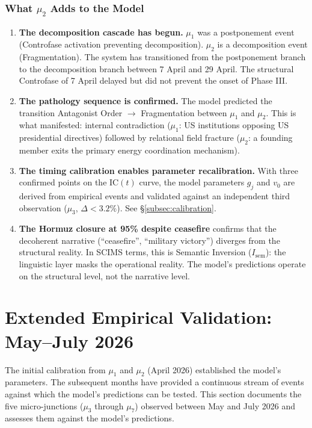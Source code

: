 \documentclass[12pt,a4paper]{article}
\newcommand{\gj}{g_j}
\newcommand{\IC}{\mathrm{IC}}
\begin{document}
\subsubsection{What $\mu_2$ Adds to the Model}

\begin{enumerate}[leftmargin=2em]
    \item \textbf{The decomposition cascade has begun.} $\mu_1$ was a postponement event (Controfase activation preventing decomposition). $\mu_2$ is a decomposition event (Fragmentation). The system has transitioned from the postponement branch to the decomposition branch between 7 April and 29 April. The structural Controfase of 7 April delayed but did not prevent the onset of Phase III.
    \item \textbf{The pathology sequence is confirmed.} The model predicted the transition Antagonist Order $\to$ Fragmentation between $\mu_1$ and $\mu_2$. This is what manifested: internal contradiction ($\mu_1$: US institutions opposing US presidential directives) followed by relational field fracture ($\mu_2$: a founding member exits the primary energy coordination mechanism).
    \item \textbf{The timing calibration enables parameter recalibration.} With three confirmed points on the $\IC(t)$ curve, the model parameters $\gj$ and $v_0$ are derived from empirical events and validated against an independent third observation ($\mu_3$, $\Delta < 3.2\%$). See \S\ref{subsec:calibration}.
    \item \textbf{The Hormuz closure at 95\% despite ceasefire} confirms that the decoherent narrative (``ceasefire'', ``military victory'') diverges from the structural reality. In SCIMS terms, this is Semantic Inversion ($I_{\mathrm{sem}}$): the linguistic layer masks the operational reality. The model's predictions operate on the structural level, not the narrative level.
\end{enumerate}


\section{Extended Empirical Validation: May--July 2026}\label{sec:extended_validation}

The initial calibration from $\mu_1$ and $\mu_2$ (April 2026) established the model's parameters. The subsequent months have provided a continuous stream of events against which the model's predictions can be tested. This section documents the five micro-junctions ($\mu_3$ through $\mu_7$) observed between May and July 2026 and assesses them against the model's predictions.
\end{document}
